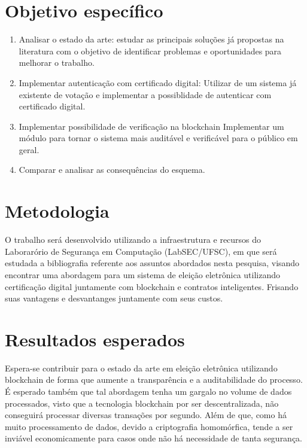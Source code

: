 \documentclass{ufsctex/ufsctex}
\begin{document}
\section{Objetivo específico}

\begin{enumerate}[label=\roman*.]
	\item Analisar o estado da arte: estudar as principais soluções
	já propostas na literatura com o objetivo de identificar problemas
	e oportunidades para melhorar o trabalho.
	\item Implementar autenticação com certificado digital: Utilizar
	de um sistema já existente de votação e implementar a possiblidade
	de autenticar com certificado digital.
	\item Implementar possibilidade de verificação na blockchain
	Implementar um módulo para tornar o sistema mais auditável e 
	verificável para o público em geral.
	\item Comparar e analisar as consequências do esquema.
\end{enumerate}

\section{Metodologia}

O trabalho será desenvolvido utilizando a infraestrutura e recursos do
Laborarório de Segurança em Computação (LabSEC/UFSC), em que será estudada
a bibliografia referente aos assuntos abordados nesta pesquisa, visando
encontrar uma abordagem para um sistema de eleição eletrônica utilizando
certificação digital juntamente com blockchain e contratos inteligentes.
Frisando suas vantagens e desvantanges juntamente com seus custos.

\section{Resultados esperados}

Espera-se contribuir para o estado da arte em eleição eletrônica utilizando
blockchain de forma que aumente a transparência e a auditabilidade do
processo. É esperado também que tal abordagem tenha um gargalo no volume de
dados processados, visto que a tecnologia blockchain por ser descentralizada,
não conseguirá processar diversas transações por segundo. Além de que,
como há muito processamento de dados, devido a criptografia homomórfica,
tende a ser inviável economicamente para casos onde não há necessidade de
tanta segurança.
\end{document}
